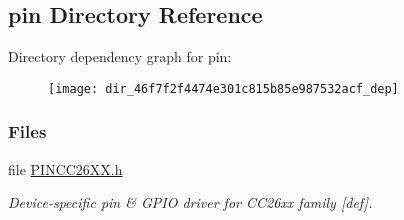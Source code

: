 \subsection{pin Directory Reference}
\label{dir_46f7f2f4474e301c815b85e987532acf}
Directory dependency graph for pin\+:
\nopagebreak
\begin{figure}[H]
\begin{center}
\leavevmode
\texttt{[image: dir\_46f7f2f4474e301c815b85e987532acf\_dep]}
\end{center}
\end{figure}
\subsubsection*{Files}
\begin{DoxyCompactItemize}
\item 
file \hyperlink{_p_i_n_c_c26_x_x_8h}{P\+I\+N\+C\+C26\+X\+X.\+h}
\begin{DoxyCompactList}\small\item\em Device-\/specific pin \& G\+P\+I\+O driver for C\+C26xx family \mbox{[}def\mbox{]}. \end{DoxyCompactList}\end{DoxyCompactItemize}
